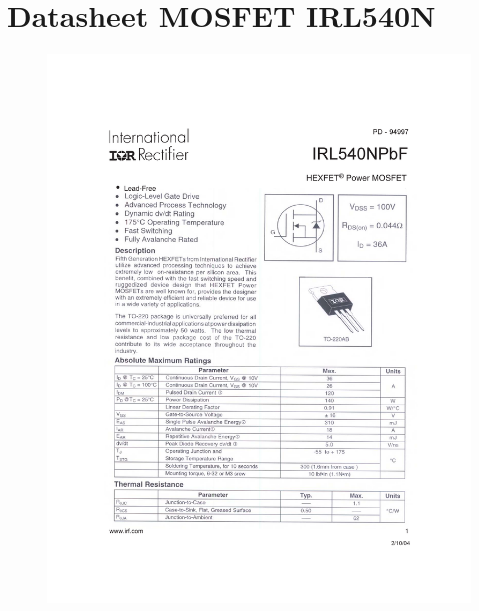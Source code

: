 \documentclass[
    iai & comatec, %
    mi, %
]{heig-tb}
\begin{document}
\section{Datasheet MOSFET IRL540N}
\begin{figure}[H]
    \hspace{-1cm}
    \includegraphics[scale = 0.8, page = 1]{assets/pdf/Infineon-IRL540N-DataSheet-v01_01-EN.pdf}
\end{figure}

\end{document}
